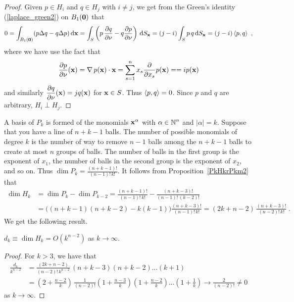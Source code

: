 \begin{proof}
Given $p\in H_i$ and $q \in H_j$ with $i \neq j$, we get from the Green's
identity (\ref{laplace_green2}) on $B_1(\VEC{0})$ that
\[
  0 = \int_{B_1(\VEC{0})} (p \Delta q - q \Delta p) \dx{\VEC{x}}
= \int_S \left( p\,\pdydx{q}{\VEC{\nu}} - q \pdydx{p}{\VEC{\nu}} \right)
\dss{S}{x} = (j - i) \int_S p\,q \dss{S}{x}
= (j-i)\ps{p}{q} \ ,
\]
where we have use the fact that
\[
 \pdydx{p}{\VEC{\nu}}(\VEC{x})
 = \graD p(\VEC{x}) \cdot \VEC{x}
 = \sum_{s=1}^n x_s \pdfdx{p}{x_s}(\VEC{x}) = 
 = i p(\VEC{x})
\]
and similarly $\displaystyle \pdydx{q}{\VEC{\nu}}(\VEC{x}) = j q(\VEC{x})$
for $\VEC{x} \in S$.  Thus $\ps{p}{q} = 0$.  Since $p$ and $q$ are
arbitrary, $H_i \perp H_j$.
\end{proof}

A basis of $P_k$ is formed of the monomials
$\displaystyle \VEC{x}^\alpha$ with
$\displaystyle \alpha \in \NN^n$ and $|\alpha| = k$.  Suppose that you
have a line of $n+k-1$ balls.  The number of possible monomials of
degree $k$ is the number of way to remove $n-1$ balls among the
$n+k-1$ balls to create at most $n$ groups of balls.  The number of
balls in the first group is the exponent of $x_1$, the number of balls
in the second group is the exponent of $x_2$, and so on.  Thus
$\displaystyle \dim P_k = \frac{(n+k-1)!}{(n-1)!\,k!}$.  It follows
from Proposition~\ref{PkHkrPkm2} that
\begin{align*}
\dim H_k &= \dim P_k - \dim P_{k-2}
= \frac{(n+k-1)!}{(n-1)!\,k!} - \frac{(n+k-3)!}{(n-1)!\,(k-2)!} \\
&= \big((n+k-1)(n+k-2) - k(k-1)\big)
\frac{(n+k-3)!}{(n-1)!\,k!}
= (2k + n - 2)\, \frac{(n+k-3)!}{(n-2)!\,k!} \ .
\end{align*}
We get the following result.

\begin{prop} \label{HkOknm2}
$d_k \equiv \dim H_k = O(k^{n-2})$ as $k \to \infty$.
\end{prop}

\begin{proof}
For $k>3$, we have that
\begin{align*}
\frac{d_k}{k^{n-2}}
&= \frac{(2k + n - 2)}{(n-2)!\,k^{n-2}}\,
(n+k-3)(n+k-2)\ldots (k+1) \\
&= \left(2 + \frac{n - 2}{k}\right)\,
\frac{1}{(n-2)!}
\left(1 + \frac{n-3}{k}\right)\left(1 + \frac{n-2}{k}\right)\ldots
\left(1 + \frac{1}{k}\right) \to \frac{2}{(n-2)!} \neq 0
\end{align*}
as $k \to \infty$.
\end{proof}

